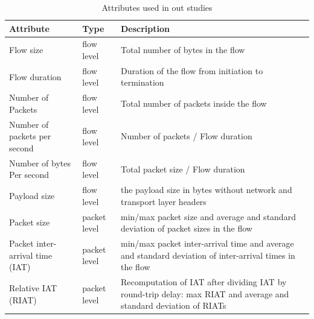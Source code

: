 \documentclass[conference]{IEEEtran}
\begin{document}
\begin{table}
    \centering
	\caption{Attributes used in out studies}
	\begin{tabular}{|l|l|p{12cm}|}
		\hline Attribute & Type & Description  \\ \hline
		\hline Flow size & flow level & Total number of bytes in the flow \\
		\hline Flow duration & flow level & Duration of the  flow from initiation to termination \\
		\hline Number of Packets & flow level & Total number of packets inside the flow  \\
		\hline Number of packets per second & flow level & Number of packets / Flow duration \\
		\hline Number of bytes Per second & flow level & Total packet size / Flow duration \\
		\hline Payload size & flow level & the payload size in bytes without network and transport layer headers \\
		\hline Packet size & packet level & min/max packet size and average and standard deviation of packet sizes in the flow  \\
		\hline Packet inter-arrival time (IAT) & packet level & min/max packet inter-arrival time and average and standard deviation of inter-arrival times in the flow  \\
		\hline Relative IAT (RIAT) & packet level & Recomputation of IAT after dividing IAT by round-trip delay:  max RIAT and average and standard deviation of RIATs \\
		\hline
	\end{tabular}
	\label{tab:attrs}
\end{table}
\end{document}
